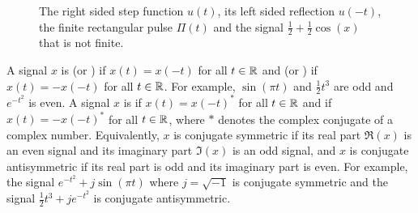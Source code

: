 \begin{figure}[tp]
\caption{The right sided step function $u(t)$, its left sided reflection $u(-t)$, the finite rectangular pulse $\Pi(t)$ and the signal $\tfrac{1}{2} + \tfrac{1}{2}\cos(x)$ that is not finite.  %
} 
\label{fig:stepsided}
\end{figure}

A signal $x$ is  (or ) if $x(t) = x(-t)$ for all $t \in {\mathbb R}$ and  (or ) if $x(t) = -x(-t)$ for all $t \in {\mathbb R}$.  For example, $\sin(\pi t)$ and $\tfrac{1}{2}t^3$ are odd and $e^{-t^2}$ is even.  %
A signal $x$ is  if $x(t) = x(-t)^*$ for all $t \in {\mathbb R}$ and  if $x(t) = -x(-t)^*$ for all $t \in {\mathbb R}$, where $*$ denotes the complex conjugate of a complex number.  Equivalently, $x$ is conjugate symmetric if its real part $\Re(x)$ is an even signal and its imaginary part $\Im(x)$ is an odd signal, and $x$ is conjugate antisymmetric if its real part is odd and its imaginary part is even.  For example, the signal $e^{-t^2} + j \sin(\pi t)$ where $j = \sqrt{-1}$ is conjugate symmetric and the signal $\tfrac{1}{2}t^{3} + j e^{-t^2}$ is conjugate antisymmetric.

